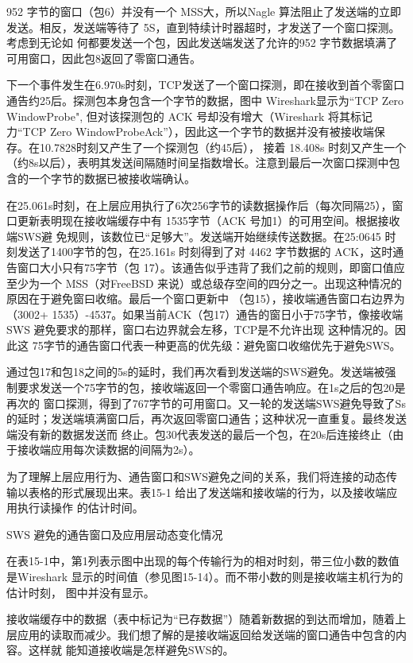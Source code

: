 952 字节的窗口（包6）并没有一个 MSS大，所以Nagle 算法阻止了发送端的立即发送。相反，发送端等待了 5S，直到特续计时器超时，才发送了一个窗口探测。考虑到无论如
何都要发送一个包，因此发送端发送了允许的952 字节数据填满了可用窗口，因此包8返回了零窗口通告。

下一个事件发生在6.970s时刻，TCP发送了一个窗口探测，即在接收到首个零窗口通告约25后。探测包本身包含一个字节的数据，图中 Wireshark显示为“TCP Zero WindowProbe",
但对该探测包的 ACK 号却没有增大（Wireshark 将其标记力“TCP Zero WindowProbeAck”），因此这一个字节的数据并没有被接收端保存。在10.7828时刻又产生了一个探测包（约45后），
接着 18.408s 时刻又产生一个（约8s以后），表明其发送间隔随时间呈指数增长。注意到最后一次窗口探测中包含的一个字节的数据已被接收端确认。

在25.061s时刻，在上层应用执行了6次256字节的读数据操作后（每次同隔25），窗口更新表明现在接收端缓存中有 1535字节（ACK 号加1）的可用空间。根据接收端SWS避
免规则，该数位已“足够大”。发送端开始继续传送数据。在25:0645 时刻发送了1400字节的包，在25.161s 时刻得到了对 4462 字节数据的 ACK，这时通告窗口大小只有75字节（包
17）。该通告似乎违背了我们之前的规则，即窗口值应至少为一个 MSS（对FreeBSD 来说）或总级存空间的四分之一。出现这种情况的原因在于避免窗曰收缩。最后一个窗口更新中
（包15），接收端通告窗口右边界为（3002+ 1535）-4537。如果当前ACK（包17）通告的窗日小于75字节，像接收端SWS 避免要求的那样，窗口右边界就会左移，TCP是不允许出现
这种情况的。因此这 75字节的通告窗口代表一种更高的优先级：避免窗口收缩优先于避免SWS。

通过包17和包18之间的5s的延时，我们再次看到发送端的SWS避免。发送端被强制要求发送一个75字节的包，接收端返回一个零窗口通告响应。在1s之后的包20是再次的
窗口探测，得到了767字节的可用窗口。又一轮的发送端SWS避免导致了Ss的延时；发送端填满窗口后，再次返回零窗口通告；这种状况一直重复。最终发送端没有新的数据发送而
终止。包30代表发送的最后一个包，在20s后连接终止（由于接收端应用每次读数据的间隔为2s）。

为了理解上层应用行为、通告窗口和SWS避免之间的关系，我们将连接的动态传输以表格的形式展现出来。表15-1 给出了发送端和接收端的行为，以及接收端应用执行读操作
的估计时间。

SWS 避免的通告窗口及应用层动态变化情况


在表15-1中，第1列表示图中出现的每个传输行为的相对时刻，带三位小数的数值是Wireshark 显示的时间值（参见图15-14）。而不带小数的则是接收端主机行为的估计时刻，
图中并没有显示。

接收端缓存中的数据（表中标记为“已存数据”）随着新数据的到达而增加，随着上层应用的读取而减少。我们想了解的是接收端返回给发送端的窗口通告中包含的内容。这样就
能知道接收端是怎样避免SWS的。

